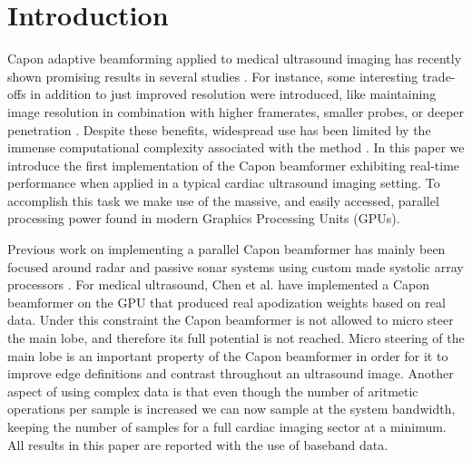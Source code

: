 \documentclass[conference]{IEEEtran}
\begin{document}
\section{Introduction}
Capon adaptive beamforming \cite{Capon1969} applied to medical ultrasound imaging has recently shown promising results in several studies \cite{Synnevag2007, Austeng2008, Vignon2008, Viola, Mehdizadeh2012}. For instance, some interesting trade-offs in addition to just improved resolution were introduced, like maintaining image resolution in combination with higher framerates, smaller probes, or deeper penetration \cite{Synnevag2009}. Despite these benefits, widespread use has been limited by the immense computational complexity associated with the method \cite{So2011}.  In this paper we introduce the first implementation of the Capon beamformer exhibiting real-time performance when applied in a typical cardiac ultrasound imaging setting. To accomplish this task we make use of the massive, and easily accessed, parallel processing power found in modern Graphics Processing Units (GPUs). 

Previous work on implementing a parallel Capon beamformer has mainly been focused around radar and passive sonar systems using custom made systolic array processors \cite{McWhirter1989, Sinha2002}. For medical ultrasound, Chen et al. \cite{Chen2011a, Chen2011} have implemented a Capon beamformer on the GPU that produced real apodization weights based on real data. Under this constraint the Capon beamformer is not allowed to micro steer the main lobe, and therefore its full potential is not reached. Micro steering of the main lobe is an important property of the Capon beamformer in order for it to improve edge definitions and contrast throughout an ultrasound image. Another aspect of using complex data is that even though the number of aritmetic operations per sample is increased we can now sample at the system bandwidth, keeping the number of samples for a full cardiac imaging sector at a minimum. All results in this paper are reported with the use of baseband data.

\end{document}
